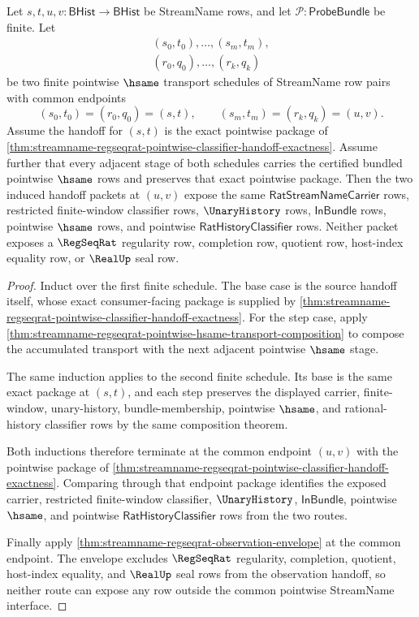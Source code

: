 \begin{theorem}
\label{thm:streamname-regseqrat-pointwise-hsame-transport-confluence}
Let $s,t,u,v:\mathsf{BHist}\to\mathsf{BHist}$ be StreamName rows, and let
$\mathcal P:\mathsf{ProbeBundle}$ be finite. Let
$$
\begin{gathered}
(s_0,t_0),\ldots,(s_m,t_m),\\
(r_0,q_0),\ldots,(r_k,q_k)
\end{gathered}
$$
be two finite pointwise $\hsame$ transport schedules of StreamName row pairs
with common endpoints
$$
(s_0,t_0)=(r_0,q_0)=(s,t),
\qquad
(s_m,t_m)=(r_k,q_k)=(u,v).
$$
Assume the handoff for $(s,t)$ is the exact pointwise package of
\autoref{thm:streamname-regseqrat-pointwise-classifier-handoff-exactness}.
Assume further that every adjacent stage of both schedules carries the
certified bundled pointwise $\hsame$ rows and preserves that exact pointwise
package. Then the two induced handoff packets at $(u,v)$ expose the same
$\mathsf{RatStreamNameCarrier}$ rows, restricted finite-window classifier
rows, $\UnaryHistory$ rows, $\mathsf{InBundle}$ rows, pointwise $\hsame$ rows,
and pointwise $\mathsf{RatHistoryClassifier}$ rows. Neither packet exposes a
$\RegSeqRat$ regularity row, completion row, quotient row, host-index equality
row, or $\RealUp$ seal row.
\end{theorem}
\begin{proof}
Induct over the first finite schedule. The base case is the source handoff
itself, whose exact consumer-facing package is supplied by
\autoref{thm:streamname-regseqrat-pointwise-classifier-handoff-exactness}.
For the step case, apply
\autoref{thm:streamname-regseqrat-pointwise-hsame-transport-composition} to
compose the accumulated transport with the next adjacent pointwise $\hsame$
stage.

The same induction applies to the second finite schedule. Its base is the
same exact package at $(s,t)$, and each step preserves the displayed carrier,
finite-window, unary-history, bundle-membership, pointwise $\hsame$, and
rational-history classifier rows by the same composition theorem.

Both inductions therefore terminate at the common endpoint $(u,v)$ with the
pointwise package of
\autoref{thm:streamname-regseqrat-pointwise-classifier-handoff-exactness}.
Comparing through that endpoint package identifies the exposed carrier,
restricted finite-window classifier, $\UnaryHistory$, $\mathsf{InBundle}$,
pointwise $\hsame$, and pointwise $\mathsf{RatHistoryClassifier}$ rows from
the two routes.

Finally apply \autoref{thm:streamname-regseqrat-observation-envelope} at the
common endpoint. The envelope excludes $\RegSeqRat$ regularity, completion,
quotient, host-index equality, and $\RealUp$ seal rows from the observation
handoff, so neither route can expose any row outside the common pointwise
StreamName interface.
\end{proof}

